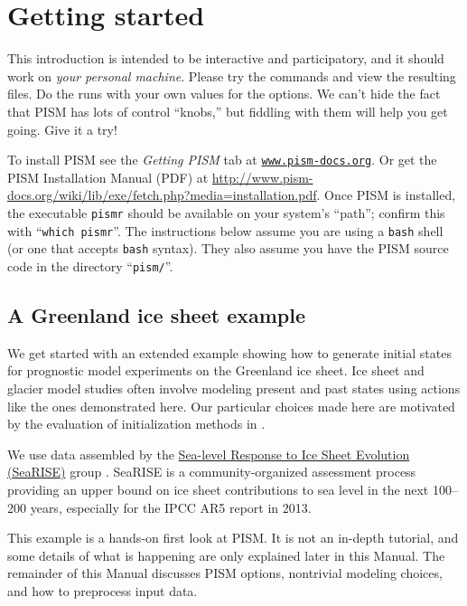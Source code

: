 
\section{Getting started}\label{sec:start}

This introduction is intended to be interactive and participatory, and it should work on \emph{your personal machine}.  Please try the commands and view the resulting files.  Do the runs with your own values for the options.  We can't hide the fact that PISM has lots of control ``knobs,'' but fiddling with them will help you get going.  Give it a try!

To install PISM see the \emph{Getting PISM} tab at \href{http://www.pism-docs.org}{\texttt{www.pism-docs.org}}.  Or get the PISM Installation Manual (PDF) at \url{http://www.pism-docs.org/wiki/lib/exe/fetch.php?media=installation.pdf}.  Once PISM is installed, the executable \texttt{pismr} should be available on your system's ``path''; confirm this with ``\texttt{which pismr}''.  The instructions below assume you are using a \texttt{bash} shell (or one that accepts \texttt{bash} syntax).  They also assume you have the PISM source code in the directory ``\texttt{pism/}''.

\subsection{A Greenland ice sheet example}

We get started with an extended example showing how to generate initial states for prognostic model experiments on the Greenland ice sheet.  Ice sheet and glacier model studies often involve modeling present and past states using actions like the ones demonstrated here.  Our particular choices made here are motivated by the evaluation of initialization methods in \cite{AschwandenAdalgeirsdottirKhroulev}.

We use data assembled by the \href{http://websrv.cs.umt.edu/isis/index.php/SeaRISE_Assessment}{Sea-level Response to Ice Sheet Evolution (SeaRISE)} group \cite{Bindschadler2013SeaRISE}.  SeaRISE is a community-organized assessment process providing an upper bound on ice sheet contributions to sea level in the next 100--200 years, especially for the IPCC AR5 report in 2013.

This example is a hands-on first look at PISM.  It is not an in-depth tutorial, and some details of what is happening are only explained later in this Manual.  The remainder of this Manual discusses PISM options, nontrivial modeling choices, and how to preprocess input data.

